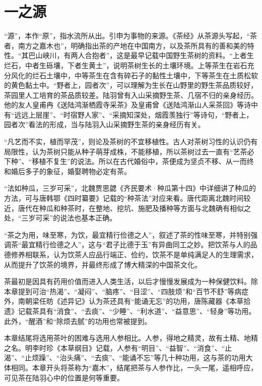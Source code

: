 \documentclass[12pt,UTF8]{ctexbook}
\begin{document}
\chapter{一之源}

“源”，本作“原”，指水流所从出。引申为事物的来源。《茶经》从茶源头写起，“茶者，南方之嘉木也”，明确指出茶的产地在中国南方，以及茶所具有的善和美的特性。“其巴山峡川，有两人合抱者”，这是最早记载中国野生茶树的资料。“上者生烂石，中者生砾壤，下者生黄土”，说明茶树生长的土壤环境。上等茶生在岩石充分风化的烂石土壤中，中等茶生在含有碎石子的黏性土壤中，下等茶生在土质松软的黄色黏土中。“野者上，园者次”，可以理解为生长在山野里的野生茶品质较好，茶园里人工培育的茶品质较差。陆羽曾有入山采摘野生茶、几宿不归的亲身经历。他的友人皇甫冉《送陆鸿渐栖霞寺采茶》及皇甫曾《送陆鸿渐山人采茶回》等诗中有“远远上层崖”、“时宿野人家”、“采摘知深处，烟霞羡独行”等诗句，“野者上，园者次”看法的形成，当与陆羽入山采摘野生茶的亲身经历有关。

“凡艺而不实，植而罕茂”，则论及茶树的不宜移植性。古人对茶树习性的认识仍有局限性，认为茶树只能从种子萌芽成株，不能移植，所以茶树过去一直有“艺茶必下种”、“移植不复生”的说法。所以在古代婚俗中，茶便成为坚贞不移、从一而终和婚后多子的象征，婚娶聘物必定有茶。

“法如种瓜，三岁可采”，北魏贾思勰《齐民要术·种瓜第十四》中详细讲了种瓜的方法，可与唐韩鄂《四时纂要》记载的“种茶法”对应来看。唐代距离北魏时间较近，唐代在种瓜和种茶时，在整地、挖坑、施肥及播种等方面与北魏确有相似之处，“三岁可采”的说法也基本正确。

“茶之为用，味至寒，为饮，最宜精行俭德之人”，叙述了茶的性味至寒，并特别强调茶“最宜精行俭德之人”，这与“君子比德于玉”有异曲同工之妙。把饮茶与人的品德修养相联系，认为饮茶人应品行端正、俭约，饮茶不是单纯满足人的生理需求，从而提升了饮茶的境界，并最终形成了博大精深的中国茶文化。

茶最初是因具有药用价值而进入人类生活，以后才慢慢发展成为一种保健饮料。除本章提到可治“热渴”、“凝闷”、“脑疼”、“目涩”、“四肢烦”和“百节不舒”等病症外，南朝梁任昉《述异记》认为茶还具有“能诵无忘”的功用，唐陈藏器《本草拾遗》记载茶具有“消食”、“去痰”、“少睡”、“利水道”、“益意思”、“轻身”等功用。此外，“醒酒”和“除烦去腻”的功用也常被提到。

本章结尾将选用茶叶的困难与选用人参相比。人参，得地之精灵，故有土精、地精之名。明李时珍《本草纲目》记载，人参有“明目”、“益智”、“消食”、“止渴”、“止烦躁”、“治头痛”、“去痰”、“能诵不忘”等几十种功用，这与茶的功用大体相同。本章开头将茶称为“嘉木”，结尾把茶与人参作比，一头一尾，遥相呼应，可见茶在陆羽心中的位置是何等重要。
\end{document}
